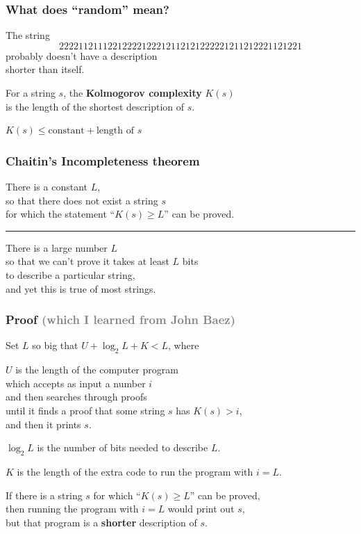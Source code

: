 \documentclass[14pt,aspectratio=169]{beamer}
\begin{document}
\begin{frame}
  \frametitle{What does ``random'' mean?}

  The string
  \[22221121112212222122212112121222221211212221121221\]
  \pause probably doesn't have a description \\
  \quad shorter than itself.

  \pause\vfill

  For a string $s$, the \textbf{Kolmogorov complexity} $K(s)$ \\
  \quad is the length of the shortest description of $s$.

  \pause\vfill

  $K(s) \leq \mbox{constant} + \mbox{length of $s$}$

\end{frame}

\begin{frame}
  \frametitle{Chaitin's Incompleteness theorem}
  
  There is a constant $L$, \\
  \quad so that there does not exist a string $s$ \\
  \quad for which the statement ``$K(s) \geq L$'' can be proved.
  
  \pause\vfill\hrule\vfill

  There is a large number $L$ \\
  \quad so that we can't prove it takes at least $L$ bits \\
  \quad to describe a particular string, \\
  and yet this is true of most strings.

\end{frame}

\begin{frame}
  \frametitle{Proof \textcolor{gray}{(which I learned from John Baez)}}

  Set $L$ so big that $U + \log_2 L + K < L$, where

  $U$ is the length of the computer program \\
  \quad which accepts as input a number $i$ \\
  \quad and then searches through proofs \\
  \quad until it finds a proof that some string $s$ has $K(s) > i$, \\
  \quad\quad and then it prints $s$.

  $\log_2 L$ is the number of bits needed to describe $L$.

  $K$ is the length of the extra code to run the program with $i = L$.

  \pause\vfill

  If there is a string $s$ for which ``$K(s) \geq L$'' can be proved, \\
  \quad then running the program with $i = L$ would print out $s$, \\
  \pause\quad but that program is a \textbf{shorter} description of $s$.

\end{frame}
\end{document}
